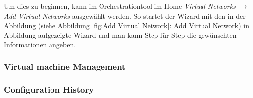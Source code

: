 Um dies zu beginnen, kann im Orchestrationtool im Home \textit{Virtual Networks $\rightarrow$ Add Virtual Networks} ausgewählt werden. So startet der Wizard mit den in der Abbildung (siehe Abbildung \ref{fig:Add Virtual Network}: Add Virtual Network) in Abbildung aufgezeigte Wizard und man kann Step für Step die gewünschten Informationen angeben.


\subsubsection{Virtual machine Management}





\subsubsection{Configuration History}





